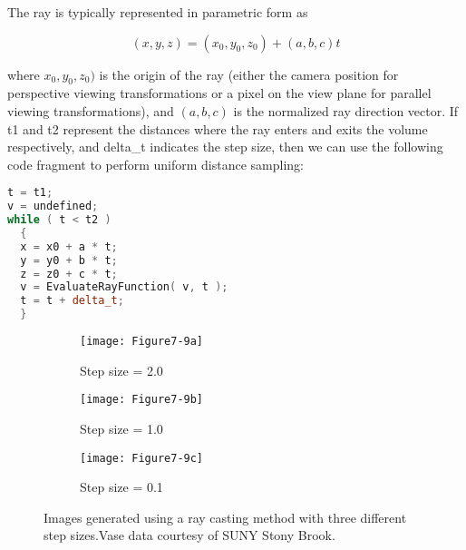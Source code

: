 The ray is typically represented in parametric form as

\begin{equation}\label{eq:7.2}
\left(x, y, z\right) = \left(x_0, y_0, z_0\right) + \left(a, b, c\right) t
\end{equation}

where $x_0,y_0,z_0)$ is the origin of the ray (either the camera position for
perspective viewing transformations or a pixel on the view plane for parallel viewing transformations), and $(a, b, c)$ is the normalized ray direction vector. If t1 and t2 represent the distances where the ray enters and exits the volume respectively, and delta\_t indicates the step size, then we can use the following code fragment to perform uniform distance sampling:

\begin{lstlisting}[language=C++, caption={Uniform distance sampling.}]
t = t1;
v = undefined;
while ( t < t2 )
  {
  x = x0 + a * t;
  y = y0 + b * t;
  z = z0 + c * t;
  v = EvaluateRayFunction( v, t );
  t = t + delta_t;
  }
\end{lstlisting}

\begin{figure}[!htb]
	\begin{subfigure}[h]{0.32\linewidth}
		\texttt{[image: Figure7-9a]}
		\caption*{Step size = 2.0}\label{fig:Figure7-9a}
	\end{subfigure}
	\hfill
	\begin{subfigure}[h]{0.32\linewidth}
		\texttt{[image: Figure7-9b]}
		\caption*{Step size = 1.0}\label{fig:Figure7-9b}
	\end{subfigure}%
	\hfill
	\begin{subfigure}[h]{0.32\linewidth}
		\texttt{[image: Figure7-9c]}
		\caption*{Step size = 0.1}\label{fig:Figure7-9c}
	\end{subfigure}%
	\caption{Images generated using a ray casting method with three different step sizes.Vase data courtesy of SUNY Stony Brook.}\label{fig:Figure7-9}
\end{figure}

